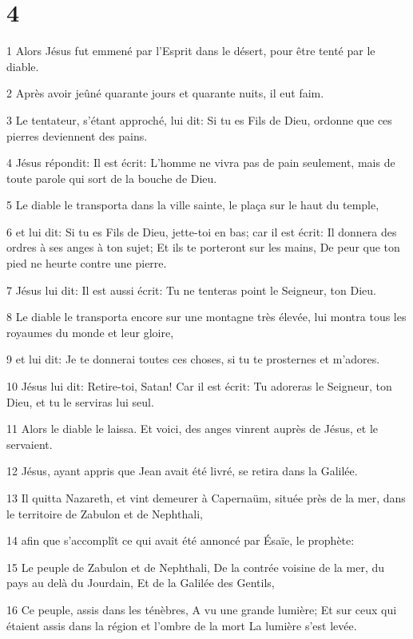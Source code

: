 \chapter{4}

\par 1 Alors Jésus fut emmené par l'Esprit dans le désert, pour être tenté par le diable.
\par 2 Après avoir jeûné quarante jours et quarante nuits, il eut faim.
\par 3 Le tentateur, s'étant approché, lui dit: Si tu es Fils de Dieu, ordonne que ces pierres deviennent des pains.
\par 4 Jésus répondit: Il est écrit: L'homme ne vivra pas de pain seulement, mais de toute parole qui sort de la bouche de Dieu.
\par 5 Le diable le transporta dans la ville sainte, le plaça sur le haut du temple,
\par 6 et lui dit: Si tu es Fils de Dieu, jette-toi en bas; car il est écrit: Il donnera des ordres à ses anges à ton sujet; Et ils te porteront sur les mains, De peur que ton pied ne heurte contre une pierre.
\par 7 Jésus lui dit: Il est aussi écrit: Tu ne tenteras point le Seigneur, ton Dieu.
\par 8 Le diable le transporta encore sur une montagne très élevée, lui montra tous les royaumes du monde et leur gloire,
\par 9 et lui dit: Je te donnerai toutes ces choses, si tu te prosternes et m'adores.
\par 10 Jésus lui dit: Retire-toi, Satan! Car il est écrit: Tu adoreras le Seigneur, ton Dieu, et tu le serviras lui seul.
\par 11 Alors le diable le laissa. Et voici, des anges vinrent auprès de Jésus, et le servaient.
\par 12 Jésus, ayant appris que Jean avait été livré, se retira dans la Galilée.
\par 13 Il quitta Nazareth, et vint demeurer à Capernaüm, située près de la mer, dans le territoire de Zabulon et de Nephthali,
\par 14 afin que s'accomplît ce qui avait été annoncé par Ésaïe, le prophète:
\par 15 Le peuple de Zabulon et de Nephthali, De la contrée voisine de la mer, du pays au delà du Jourdain, Et de la Galilée des Gentils,
\par 16 Ce peuple, assis dans les ténèbres, A vu une grande lumière; Et sur ceux qui étaient assis dans la région et l'ombre de la mort La lumière s'est levée.
